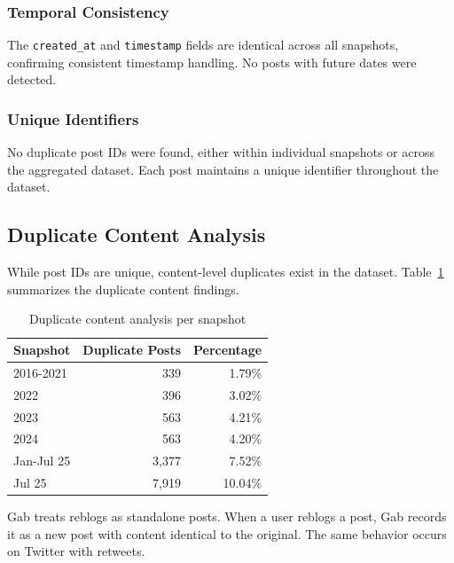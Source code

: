 \subsubsection{Temporal Consistency}

The \texttt{created\_at} and \texttt{timestamp} fields are identical across all snapshots, confirming consistent timestamp handling. No posts with future dates were detected.

\subsubsection{Unique Identifiers}

No duplicate post IDs were found, either within individual snapshots or across the aggregated dataset. Each post maintains a unique identifier throughout the dataset.

\subsection*{Duplicate Content Analysis}

While post IDs are unique, content-level duplicates exist in the dataset. Table~\ref{tab:duplicates} summarizes the duplicate content findings.

\begin{table}[H]
	\centering
	\caption{Duplicate content analysis per snapshot}
	\label{tab:duplicates}
	\begin{tabular}{lrr}
		\toprule
		\textbf{Snapshot} & \textbf{Duplicate Posts} & \textbf{Percentage} \\
		\midrule
		2016-2021         & 339                      & 1.79\%              \\
		2022              & 396                      & 3.02\%              \\
		2023              & 563                      & 4.21\%              \\
		2024              & 563                      & 4.20\%              \\
		Jan-Jul 25        & 3,377                    & 7.52\%              \\
		Jul 25            & 7,919                    & 10.04\%             \\
		\bottomrule
	\end{tabular}
\end{table}

Gab treats reblogs as standalone posts. When a user reblogs a post, Gab records it as a new post with content identical to the original. The same behavior occurs on Twitter with retweets.

